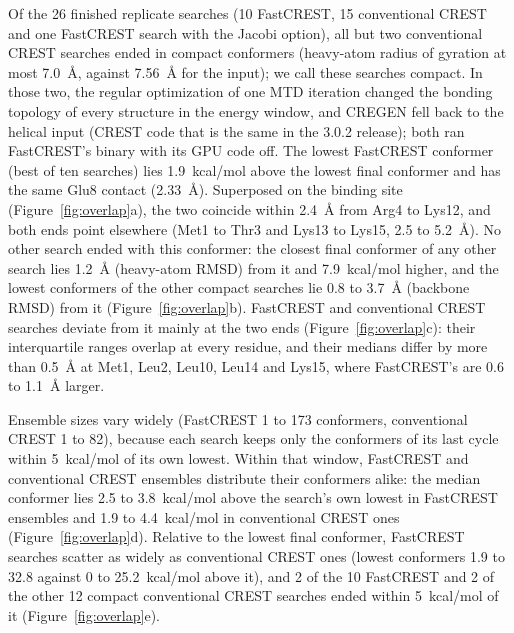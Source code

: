 \documentclass[journal=jctcce,manuscript=article]{achemso}
\begin{document}
Of the 26 finished replicate searches (10 FastCREST, 15 conventional CREST and one FastCREST search with the Jacobi option), all but two conventional CREST searches ended in compact conformers (heavy-atom radius of gyration at most 7.0~\AA, against 7.56~\AA{} for the input); we call these searches compact. In those two, the regular optimization of one MTD iteration changed the bonding topology of every structure in the energy window, and CREGEN fell back to the helical input (CREST code that is the same in the 3.0.2 release); both ran FastCREST's binary with its GPU code off. The lowest FastCREST conformer (best of ten searches) lies 1.9~kcal/mol above the lowest final conformer and has the same Glu8 contact (2.33~\AA). Superposed on the binding site\cite{kabsch1976} (Figure~\ref{fig:overlap}a), the two coincide within 2.4~\AA{} from Arg4 to Lys12, and both ends point elsewhere (Met1 to Thr3 and Lys13 to Lys15, 2.5 to 5.2~\AA). No other search ended with this conformer: the closest final conformer of any other search lies 1.2~\AA{} (heavy-atom RMSD) from it and 7.9~kcal/mol higher, and the lowest conformers of the other compact searches lie 0.8 to 3.7~\AA{} (backbone RMSD) from it (Figure~\ref{fig:overlap}b). FastCREST and conventional CREST searches deviate from it mainly at the two ends (Figure~\ref{fig:overlap}c): their interquartile ranges overlap at every residue, and their medians differ by more than 0.5~\AA{} at Met1, Leu2, Leu10, Leu14 and Lys15, where FastCREST's are 0.6 to 1.1~\AA{} larger.

Ensemble sizes vary widely (FastCREST 1 to 173 conformers, conventional CREST 1 to 82), because each search keeps only the conformers of its last cycle within 5~kcal/mol of its own lowest. Within that window, FastCREST and conventional CREST ensembles distribute their conformers alike: the median conformer lies 2.5 to 3.8~kcal/mol above the search's own lowest in FastCREST ensembles and 1.9 to 4.4~kcal/mol in conventional CREST ones (Figure~\ref{fig:overlap}d). Relative to the lowest final conformer, FastCREST searches scatter as widely as conventional CREST ones (lowest conformers 1.9 to 32.8 against 0 to 25.2~kcal/mol above it), and 2 of the 10 FastCREST and 2 of the other 12 compact conventional CREST searches ended within 5~kcal/mol of it (Figure~\ref{fig:overlap}e).
\end{document}
